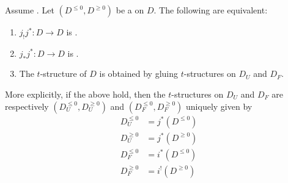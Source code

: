\begin{proposition} \label{proposition:t_structure_on_a_tri_cat_is_obtained_by_gluing_iff_appropriate_self_functors_passing_through_the_open_tri_cat_are_right_left_t_exact}
Assume . Let $(D^{\leq 0}, D^{\geq 0})$ be a  on $D$. The following are equivalent:
\begin{enumerate}
    \item $j_! j^*: D \to D$ is .
    \item $j_* j^*: D \to D$ is .
    \item The $t$-structure of $D$ is obtained by gluing $t$-structures on $D_U$ and $D_F$.
\end{enumerate}
More explicitly, if the above hold, then the $t$-structures on $D_U$ and $D_F$ are respectively $(D_U^{\leq 0}, D_U^{\geq 0})$ and $(D_F^{\leq 0}, D_F^{\geq 0})$ uniquely given by 
\begin{align*}
    D_U^{\leq 0} &= j^*(D^{\leq 0}) \\
    D_U^{\geq 0} &= j^*(D^{\geq 0}) \\
    D_F^{\leq 0} &= i^*(D^{\leq 0}) \\
    D_F^{\geq 0} &= i^!(D^{\geq 0}) \\
\end{align*}
\end{proposition}
